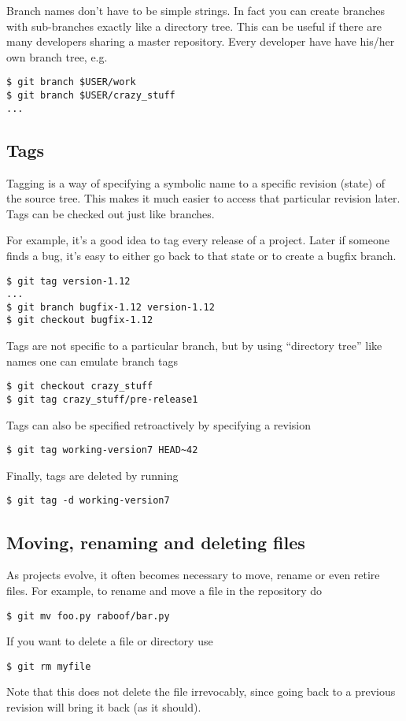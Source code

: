 \documentclass[a4paper,10pt]{article}
\begin{document}
Branch names don't have to be simple strings. In fact you can create branches
with sub-branches exactly like a directory tree. This can be useful if there
are many developers sharing a master repository. Every developer have have
his/her own branch tree, e.g.
\begin{verbatim}
$ git branch $USER/work
$ git branch $USER/crazy_stuff
...
\end{verbatim}

\subsection{Tags}
Tagging is a way of specifying a symbolic name to a specific revision (state) 
of the source tree. This makes it much easier to access that particular
revision later. Tags can be checked out just like branches.

For example, it's a good idea to tag every release of a
project. Later if someone finds a bug, it's easy to either go back to that
state or to create a bugfix branch.
\begin{verbatim}
$ git tag version-1.12
...
$ git branch bugfix-1.12 version-1.12
$ git checkout bugfix-1.12
\end{verbatim}
Tags are not specific to a particular branch, but by using
``directory tree'' like names one can emulate branch tags
\begin{verbatim}
$ git checkout crazy_stuff
$ git tag crazy_stuff/pre-release1
\end{verbatim}
Tags can also be specified retroactively by specifying a revision
\begin{verbatim}
$ git tag working-version7 HEAD~42
\end{verbatim}
Finally, tags are deleted by running
\begin{verbatim}
$ git tag -d working-version7 
\end{verbatim}

\subsection{Moving, renaming and deleting files}
As projects evolve, it often becomes necessary to move, rename or even retire 
files. For example, to rename and move a file in the repository do 
\begin{verbatim}
$ git mv foo.py raboof/bar.py
\end{verbatim}
If you want to delete a file or directory use
\begin{verbatim}
$ git rm myfile
\end{verbatim}
Note that this does not delete the file irrevocably, since going back to a
previous revision will bring it back (as it should).
\end{document}
